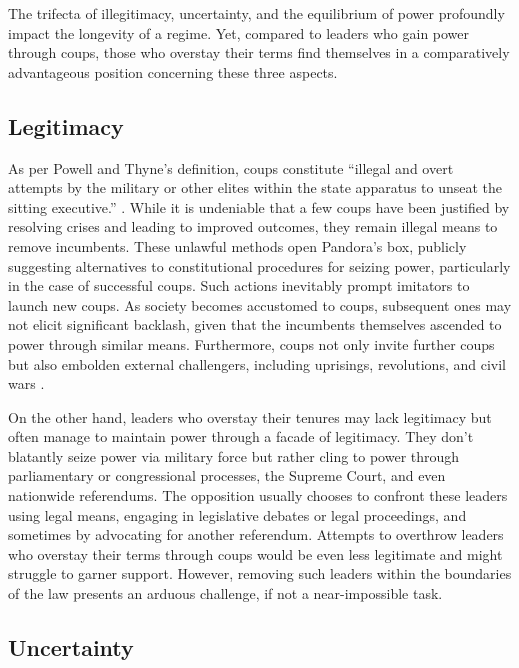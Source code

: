 \documentclass[
  12pt,
  a4paper,
  12pt]{article}
\begin{document}
The trifecta of illegitimacy, uncertainty, and the equilibrium of power
profoundly impact the longevity of a regime. Yet, compared to leaders
who gain power through coups, those who overstay their terms find
themselves in a comparatively advantageous position concerning these
three aspects.

\hypertarget{legitimacy}{%
\subsection{Legitimacy}\label{legitimacy}}

As per Powell and Thyne's definition, coups constitute ``illegal and
overt attempts by the military or other elites within the state
apparatus to unseat the sitting executive.'' \citep[p.252]{powell2011}.
While it is undeniable that a few coups have been justified by resolving
crises and leading to improved outcomes, they remain illegal means to
remove incumbents. These unlawful methods open Pandora's box, publicly
suggesting alternatives to constitutional procedures for seizing power,
particularly in the case of successful coups. Such actions inevitably
prompt imitators to launch new coups. As society becomes accustomed to
coups, subsequent ones may not elicit significant backlash, given that
the incumbents themselves ascended to power through similar means.
Furthermore, coups not only invite further coups but also embolden
external challengers, including uprisings, revolutions, and civil wars
\citep{dahl2023}.

On the other hand, leaders who overstay their tenures may lack
legitimacy but often manage to maintain power through a facade of
legitimacy. They don't blatantly seize power via military force but
rather cling to power through parliamentary or congressional processes,
the Supreme Court, and even nationwide referendums. The opposition
usually chooses to confront these leaders using legal means, engaging in
legislative debates or legal proceedings, and sometimes by advocating
for another referendum. Attempts to overthrow leaders who overstay their
terms through coups would be even less legitimate and might struggle to
garner support. However, removing such leaders within the boundaries of
the law presents an arduous challenge, if not a near-impossible task.

\hypertarget{uncertainty}{%
\subsection{Uncertainty}\label{uncertainty}}
\end{document}

